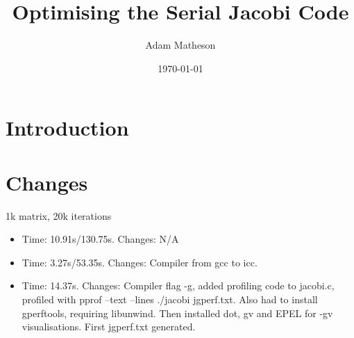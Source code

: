 \documentclass{article}
\begin{document}
\title{Optimising the Serial Jacobi Code}
\author{Adam Matheson}
\date{\today}

\section{Introduction}

\section{Changes}
1k matrix, 20k iterations
\begin{itemize}
\item Time: 10.91s/130.75s. Changes: N/A
\item Time: 3.27s/53.35s. Changes: Compiler from gcc to icc.
\item Time: 14.37s. Changes: Compiler flag -g, added profiling code to jacobi.c, profiled with pprof --text --lines ./jacobi jgperf.txt. Also had to install gperftools, requiring libunwind. Then installed dot, gv and EPEL for -gv visualisations. First jgperf.txt generated.

\end{itemize}
\end{document}
